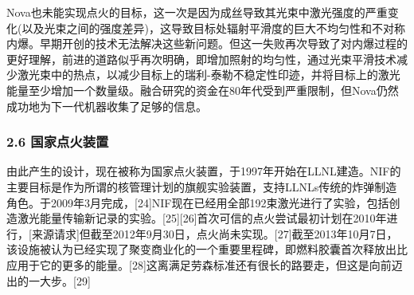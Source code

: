 Nova也未能实现点火的目标，这一次是因为成丝导致其光束中激光强度的严重变化(以及光束之间的强度差异)，这导致目标处辐射平滑度的巨大不均匀性和不对称内爆。早期开创的技术无法解决这些新问题。但这一失败再次导致了对内爆过程的更好理解，前进的道路似乎再次明确，即增加照射的均匀性，通过光束平滑技术减少激光束中的热点，以减少目标上的瑞利-泰勒不稳定性印迹，并将目标上的激光能量至少增加一个数量级。融合研究的资金在80年代受到严重限制，但Nova仍然成功地为下一代机器收集了足够的信息。
\subsubsection{2.6 国家点火装置}
由此产生的设计，现在被称为国家点火装置，于1997年开始在LLNL建造。NIF的主要目标是作为所谓的核管理计划的旗舰实验装置，支持LLNLs传统的炸弹制造角色。于2009年3月完成，[24]NIF现在已经用全部192束激光进行了实验，包括创造激光能量传输新记录的实验。[25][26]首次可信的点火尝试最初计划在2010年进行，[来源请求]但截至2012年9月30日，点火尚未实现。[27]截至2013年10月7日，该设施被认为已经实现了聚变商业化的一个重要里程碑，即燃料胶囊首次释放出比应用于它的更多的能量。[28]这离满足劳森标准还有很长的路要走，但这是向前迈出的一大步。[29]